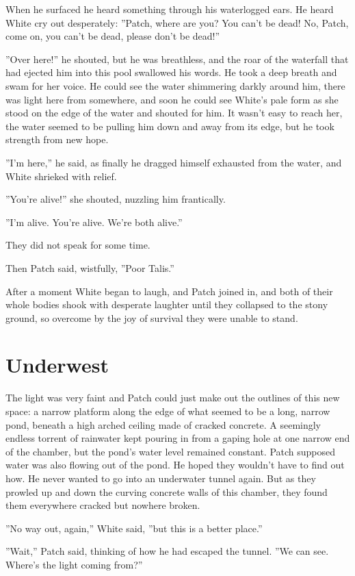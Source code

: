 \documentclass[12pt]{book}
\begin{document}
When he surfaced he heard something through his waterlogged ears. He
heard White cry out desperately: ''Patch, where are you? You can't be
dead! No, Patch, come on, you can't be dead, please don't be dead!''

''Over here!'' he shouted, but he was breathless, and the roar of the
waterfall that had ejected him into this pool swallowed his words. He
took a deep breath and swam for her voice. He could see the water
shimmering darkly around him, there was light here from somewhere, and
soon he could see White's pale form as she stood on the edge of the
water and shouted for him. It wasn't easy to reach her, the water
seemed to be pulling him down and away from its edge, but he took
strength from new hope.

''I'm here,'' he said, as finally he dragged himself exhausted from
the water, and White shrieked with relief.

''You're alive!'' she shouted, nuzzling him frantically.

''I'm alive. You're alive. We're both alive.''

They did not speak for some time.

Then Patch said, wistfully, ''Poor Talis.''

After a moment White began to laugh, and Patch joined in, and both of
their whole bodies shook with desperate laughter until they collapsed
to the stony ground, so overcome by the joy of survival they were
unable to stand.


\section{Underwest}

The light was very faint and Patch could just make out the outlines of
this new space: a narrow platform along the edge of what seemed to be
a long, narrow pond, beneath a high arched ceiling made of cracked
concrete. A seemingly endless torrent of rainwater kept pouring in
from a gaping hole at one narrow end of the chamber, but the pond's
water level remained constant. Patch supposed water was also flowing
out of the pond. He hoped they wouldn't have to find out how. He never
wanted to go into an underwater tunnel again. But as they prowled up
and down the curving concrete walls of this chamber, they found them
everywhere cracked but nowhere broken.

''No way out, again,'' White said, ''but this is a better place.''

''Wait,'' Patch said, thinking of how he had escaped the tunnel. ''We
can see. Where's the light coming from?''
\end{document}
